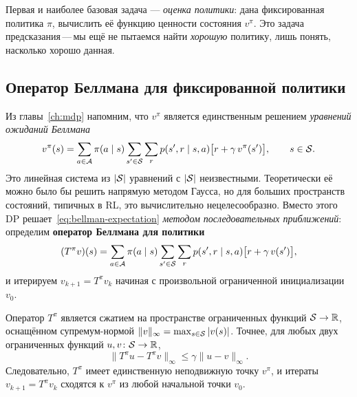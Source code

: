 Первая и наиболее базовая задача — \emph{оценка политики}: дана фиксированная политика $\pi$, вычислить её функцию ценности состояния $v^\pi$.  Это задача предсказания\,---\,мы ещё не пытаемся найти \emph{хорошую} политику, лишь понять, насколько хорошо данная.

\subsection*{Оператор Беллмана для фиксированной политики}

Из главы~\ref{ch:mdp} напомним, что $v^\pi$ является единственным решением \emph{уравнений ожиданий Беллмана}
\begin{equation}
\label{eq:bellman-expectation}
v^\pi(s) = \sum_{a \in \mathcal{A}} \pi(a \mid s) \sum_{s' \in \mathcal{S}} \sum_{r} p(s', r \mid s, a)\bigl[r + \gamma\, v^\pi(s')\bigr], \qquad s \in \mathcal{S}.
\end{equation}
Это линейная система из $|\mathcal{S}|$ уравнений с $|\mathcal{S}|$ неизвестными.  Теоретически её можно было бы решить напрямую методом Гаусса, но для больших пространств состояний, типичных в RL, это вычислительно нецелесообразно.  Вместо этого DP решает~\eqref{eq:bellman-expectation} \emph{методом последовательных приближений}: определим \textbf{оператор Беллмана для политики}
\begin{equation}
\label{eq:bellman-operator}
(T^\pi v)(s) = \sum_{a \in \mathcal{A}} \pi(a \mid s) \sum_{s' \in \mathcal{S}} \sum_{r} p(s', r \mid s, a)\bigl[r + \gamma\, v(s')\bigr],
\end{equation}
и итерируем $v_{k+1} = T^\pi v_k$ начиная с произвольной ограниченной инициализации $v_0$.

\begin{theorem}[Сжатие $T^\pi$]
\label{thm:contraction-ch4}
Оператор $T^\pi$ является сжатием на пространстве ограниченных функций $\mathcal{S} \to \mathbb{R}$, оснащённом супремум-нормой $\|v\|_\infty = \max_{s \in \mathcal{S}}|v(s)|$.  Точнее, для любых двух ограниченных функций $u, v \colon \mathcal{S} \to \mathbb{R}$,
\[
\|T^\pi u - T^\pi v\|_\infty \le \gamma \|u - v\|_\infty.
\]
Следовательно, $T^\pi$ имеет единственную неподвижную точку $v^\pi$, и итераты $v_{k+1} = T^\pi v_k$ сходятся к $v^\pi$ из любой начальной точки $v_0$.
\end{theorem}

